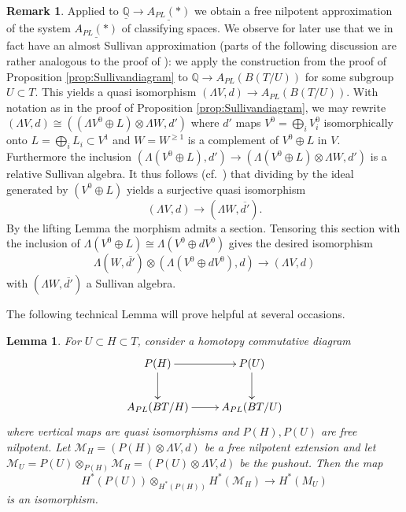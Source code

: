 \documentclass[12pt,a4paper]{article}
\newtheorem{lem}[thm]{Lemma}
\theoremstyle{definition}
\newtheorem{rem}[thm]{Remark}
\begin{document}
\begin{rem}
Applied to $\underline{\mathbb{Q}}\rightarrow \underline{A_{PL}(*)}$ we obtain a free nilpotent approximation of the system $\underline{A_{PL}(*)}$ of classifying spaces. We observe for later use that we in fact have an almost Sullivan approximation (parts of the following discussion are rather analogous to the proof of \cite[Theorem 14.7]{BibelI}): we apply the construction from the proof of Proposition \ref{prop:Sullivandiagram} to $\mathbb{Q}\rightarrow A_{PL}(B(T/U))$ for some subgroup $U\subset T$. This yields a quasi isomorphism $(\Lambda V,d)\rightarrow A_{PL}(B(T/U))$. With notation as in the proof of Proposition \ref{prop:Sullivandiagram}, we may rewrite $(\Lambda V,d)\cong ((\Lambda V^0\oplus L)\otimes \Lambda W,d')$ where $d'$ maps $V^0=\bigoplus_i V_i^0$ isomorphically onto $L=\bigoplus_i L_i\subset V^1$ and $W=W^{\geq 1}$ is a complement of $V^0\oplus L$ in $V$. Furthermore the inclusion
$(\Lambda(V^0\oplus L),d')\rightarrow (\Lambda(V^0\oplus L)\otimes \Lambda W,d')$ is a relative Sullivan algebra. It thus follows (cf.\ \cite[Proposition 6.7]{BibelI}) that dividing by the ideal generated by $(V^0\oplus L)$ yields a surjective quasi isomorphism
\[(\Lambda V,d)\rightarrow (\Lambda W,\overline{d'}).\]
By the lifting Lemma the morphism admits a section. Tensoring this section with the inclusion of $\Lambda(V^0\oplus L)\cong \Lambda (V^0\oplus dV^0)$ gives the desired isomorphism
\[\Lambda(W,\overline{d'})\otimes (\Lambda(V^0\oplus dV^0),d)\rightarrow(\Lambda V,d)\]
with $(\Lambda W,\overline{d'})$ a Sullivan algebra.
\end{rem}

The following technical Lemma will prove helpful at several occasions.

\begin{lem}\label{lem:tensorTC}
For $U\subset H\subset T$, consider a homotopy commutative diagram \[\xymatrix{P(H)\ar[r]\ar[d] & P(U)\ar[d]\\
A_{PL}(BT/H)\ar[r]& A_{PL}(BT/U)
}\]
where vertical maps are quasi isomorphisms and $P(H),P(U)$ are free nilpotent. Let $\mathcal{M}_H=(P(H)\otimes \Lambda V,d)$ be a free nilpotent extension and let $\mathcal{M}_U=P(U)\otimes_{P(H)} \mathcal{M}_H=(P(U)\otimes \Lambda V,d)$ be the pushout. Then the map
\[H^*(P(U))\otimes_{H^*(P(H))}H^*(\mathcal{M}_H)\rightarrow H^*(M_U)\]
is an isomorphism.
\end{lem}
\end{document}
